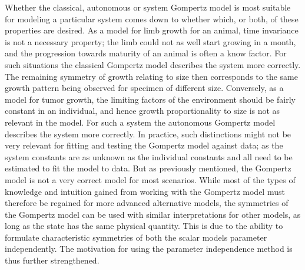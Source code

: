 Whether the classical, autonomous or system Gompertz model is most suitable for modeling a particular system comes down to whether which, or both, of these properties are desired.
As a model for limb growth for an animal, time invariance is not a necessary property; the limb could not as well start growing in a month, and the progression towards maturity of an animal is often a know factor.
For such situations the classical Gompertz model describes the system more correctly.
The remaining symmetry of growth relating to size then corresponds to the same growth pattern being observed for specimen of different size.
Conversely, as a model for tumor growth, the limiting factors of the environment should be fairly constant in an individual, and hence growth proportionality to size is not as relevant in the model.
For such a system the autonomous Gompertz model describes the system more correctly.
In practice, such distinctions might not be very relevant for fitting and testing the Gompertz model against data; as the system constants are as unknown as the individual constants and all need to be estimated to fit the model to data.
But as previously mentioned, the Gompertz model is not a very correct model for most scenarios.
While most of the types of knowledge and intuition gained from working with the Gompertz model must therefore be regained for more advanced alternative models, the symmetries of the Gompertz model can be used with similar interpretations for other models, as long as the state has the same physical quantity.
This is due to the ability to formulate characteristic symmetries of both the scalar models parameter independently.
The motivation for using the parameter independence method is thus further strengthened.

